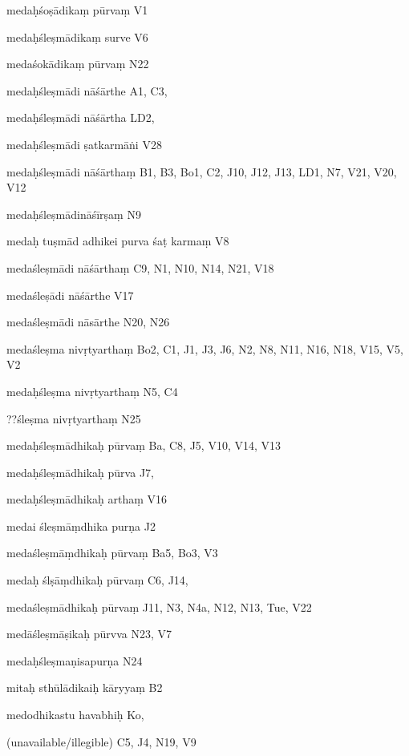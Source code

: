 \begin{ekdosis}
\begin{marma}[hp01_055]
\begin{marma}[hp02_009]
\begin{marma}[hp02_011]
        \begin{marma}[hp02_021]
        \item[medaḥśoṣādikaṃ pūrvaṃ] V1
        \item[medaḥśleṣmādikaṃ surve] V6
        \item[medaśokādikaṃ pūrvaṃ] N22
        \item[medaḥśleṣmādi nāśārthe] A1, C3,
        \item[medaḥśleṣmādi nāśārtha] LD2,
        \item[medaḥśleṣmādi ṣatkarmāṅi] V28
        \item[medaḥśleṣmādi nāśārthaṃ] B1, B3, Bo1, C2, J10, J12, J13, LD1, N7, V21, V20, V12
        \item[medaḥśleṣmādināśīrṣaṃ] N9
        \item[medaḥ tuṣmād adhikei purva śaṭ karmaṃ] V8
        \item[medaśleṣmādi nāśārthaṃ] C9, N1, N10, N14, N21, V18
        \item[medaśleṣādi nāśārthe] V17
        \item[medaśleṣmādi nāsārthe] N20, N26
        \item[medaśleṣma nivṛtyarthaṃ] Bo2, C1, J1, J3, J6, N2, N8, N11, N16, N18, V15, V5, V2
        \item[medaḥśleṣma nivṛtyarthaṃ] N5, C4
        \item[??śleṣma nivṛtyarthaṃ] N25
        \item[medaḥśleṣmādhikaḥ pūrvaṃ] Ba, C8, J5, V10, V14, V13
        \item[medaḥśleṣmādhikaḥ pūrva] J7,
        \item[medaḥśleṣmādhikaḥ arthaṃ] V16
        \item[medai śleṣmāṃdhika purṇa] J2
        \item[medaśleṣmāṃdhikaḥ pūrvaṃ] Ba5, Bo3, V3
        \item[medaḥ ślṣāṃdhikaḥ pūrvaṃ] C6, J14, 
        \item[medaśleṣmādhikaḥ pūrvaṃ]  J11, N3, N4a, N12, N13, Tue, V22
        \item[medāśleṣmāṣikaḥ pūrvva] N23, V7
        \item[medaḥśleṣmaṇisapurṇa] N24 
        \item[mitaḥ sthūlādikaiḥ kāryyaṃ] B2
        \item[medodhikastu havabhiḥ] Ko,
        \item[(unavailable/illegible)] C5, J4, N19, V9
          \begin{description}


\end{description}
\end{marma}
\end{marma}
\end{marma}
\end{marma}
\end{ekdosis}
